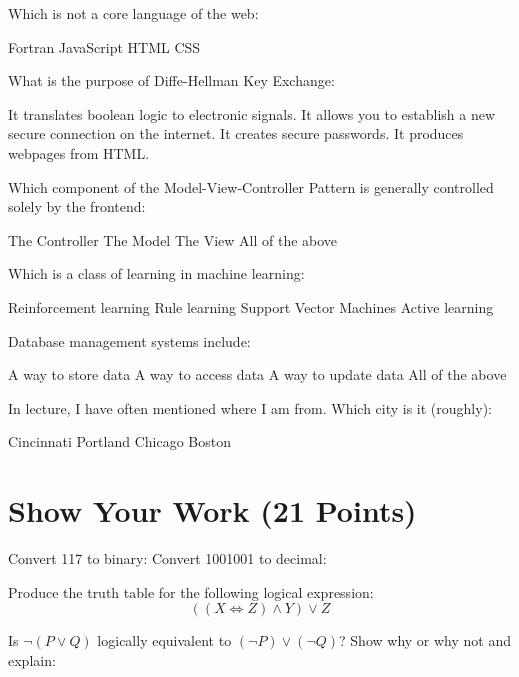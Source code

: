 \documentclass{exam}
\begin{document}
\begin{questions}
\question[1] Which is not a core language of the web:
\begin{choices}
    \choice Fortran
    \choice JavaScript
    \choice HTML
    \choice CSS
\end{choices}
\question[1] What is the purpose of Diffe-Hellman Key Exchange:
\begin{choices}
    \choice It translates boolean logic to electronic signals.
    \choice It allows you to establish a new secure connection on the internet.
    \choice It creates secure passwords.
    \choice It produces webpages from HTML. 
\end{choices}
\question[1] Which component of the Model-View-Controller Pattern is generally controlled solely by the frontend:
\begin{choices}
    \choice The Controller
    \choice The Model
    \choice The View
    \choice All of the above
\end{choices}
\question[1] Which is a class of learning in machine learning:
\begin{choices}
    \choice Reinforcement learning
    \choice Rule learning
    \choice Support Vector Machines
    \choice Active learning
\end{choices}
\question[1] Database management systems include:
\begin{choices}
    \choice A way to store data
    \choice A way to access data
    \choice A way to update data
    \choice All of the above
\end{choices}

\bonusquestion[1] In lecture, I have often mentioned where I am from. Which city is it (roughly):
\begin{choices}
    \choice Cincinnati
    \choice Portland
    \choice Chicago
    \choice Boston
\end{choices}

\newpage
\section{Show Your Work (21 Points)}
\question[3] Convert 117 to binary:
\vspace{4.5in}
\question[3] Convert 1001001 to decimal:
\newpage 

\question[5] Produce the truth table for the following logical expression:
\[
((X \iff Z) \land Y) \lor Z
\]
\vspace{4in}

\question[5] Is $\lnot (P \lor Q)$ logically equivalent to $(\lnot P) \lor (\lnot Q)$? Show why or why not and explain:


\end{questions}
\end{document}
